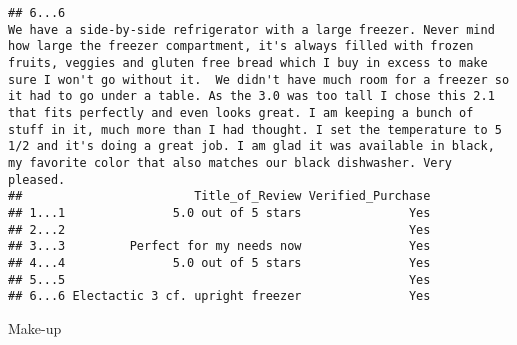 \documentclass[
  11pt,
]{article}
\begin{document}
\begin{verbatim}
## 6...6                                                                                                                                                                                                                                                                                                                                                                                                                                                                                                                                                                                                                                                                                                                                                                                                                                          We have a side-by-side refrigerator with a large freezer. Never mind how large the freezer compartment, it's always filled with frozen fruits, veggies and gluten free bread which I buy in excess to make sure I won't go without it.  We didn't have much room for a freezer so it had to go under a table. As the 3.0 was too tall I chose this 2.1 that fits perfectly and even looks great. I am keeping a bunch of stuff in it, much more than I had thought. I set the temperature to 5 1/2 and it's doing a great job. I am glad it was available in black, my favorite color that also matches our black dishwasher. Very pleased.
##                        Title_of_Review Verified_Purchase
## 1...1               5.0 out of 5 stars               Yes
## 2...2                                                Yes
## 3...3         Perfect for my needs now               Yes
## 4...4               5.0 out of 5 stars               Yes
## 5...5                                                Yes
## 6...6 Electactic 3 cf. upright freezer               Yes
\end{verbatim}

Make-up
\end{document}
